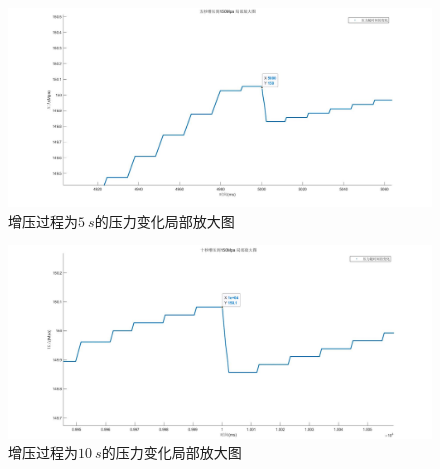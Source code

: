 \documentclass[withoutpreface,bwprint]{cumcmthesis} %
\begin{document}
    \begin{figure}[H]
        \begin{floatrow}
    \end{floatrow}
    \end{figure}


    \begin{figure}[!h]
    \centering
    \includegraphics[width=.85\textwidth]{5s_m.jpg}
    \caption{增压过程为$5~s$的压力变化局部放大图}
    \label{figure8}
    \end{figure}
 
    \begin{figure}[htbp]
    \centering
    \includegraphics[width=.85\textwidth]{10s_m.jpg}
    \caption{增压过程为$10~s$的压力变化局部放大图}
    \label{figure9}
    \end{figure}    
\end{document}
